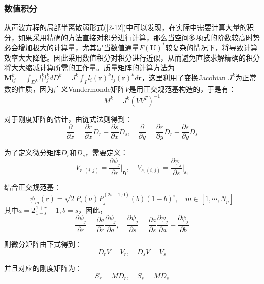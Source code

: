 \documentclass[12pt]{article}
\begin{document}
\subsubsection{数值积分}
从声波方程的局部半离散弱形式(\ref{2-12})中可以发现，在实际中需要计算大量的积分，如果采用精确的方法直接对积分进行计算，那么当空间多项式的阶数较高时势必会增加极大的计算量，尤其是当数值通量$F(\boldsymbol{U})^*$较复杂的情况下，将导致计算效率大大降低。因此采用数值积分对积分进行近似，从而避免直接求解精确的积分将大大缩减计算所需的工作量。质量矩阵的计算方法为$\boldsymbol{M}_{ij}^k=\int_{D^k}l_i^k l_j^k dD^k=J^k\int_I l_i(\boldsymbol{r})^k l_j(\boldsymbol{r})^k d\boldsymbol{r}$，这里利用了变换Jacobian $J^k$为正常数的性质，因为广义Vandermonde矩阵$V$是用正交规范基构造的，于是有：
\begin{equation}\label{2-44}
M^k=J^k(VV^T)^{-1}
\end{equation}
\par
对于刚度矩阵的估计，由链式法则得到：
\begin{equation}\label{2-45}
\frac{\partial}{\partial x}=\frac{\partial r}{\partial x}D_r+\frac{\partial s}{\partial x}D_s,\quad \frac{\partial}{\partial y}=\frac{\partial r}{\partial y}D_r+\frac{\partial s}{\partial y}D_s 
\end{equation}
\par
为了定义微分矩阵$D_r$和$D_s$，需要定义：
\begin{equation}\label{2-46}
V_{r,(i,j)}=\frac{\partial \psi_j}{\partial r} \vert_{\boldsymbol{r_i}},\quad V_{s,(i,j)}=\frac{\partial \psi_j}{\partial s} \vert_{\boldsymbol{s_i}}
\end{equation}
\par
结合正交规范基：
\begin{equation}\label{2-47}
\psi_m(\boldsymbol{r})=\sqrt{2}P_i(a)P_j^{(2i+1,0)}(b)(1-b)^i,\quad m \in [1,\cdots,N_p]
\end{equation}
其中$a=2\frac{1+r}{1-s}-1,b=s$，因此，
\begin{equation}\label{2-48}
\frac{\partial \psi_j}{\partial r}=\frac{\partial a}{\partial r}\frac{\partial \psi_j}{\partial a},\quad \frac{\partial \psi_j}{\partial s}=\frac{\partial a}{\partial s}\frac{\partial \psi_j}{\partial a}+\frac{\partial \psi_j}{\partial b}
\end{equation}
\par
则微分矩阵由下式得到：
\begin{equation}\label{2-49}
D_r V=V_r,\quad D_s V=V_s
\end{equation}
\par
并且对应的刚度矩阵为：
\begin{equation}\label{2-50}
S_r=MD_r,\quad S_s=MD_s
\end{equation}
\end{document}
